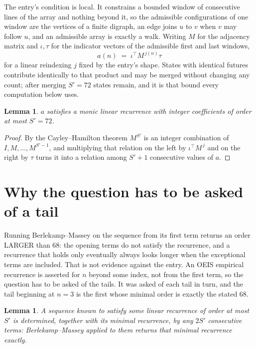 \documentclass[11pt,a4paper]{article}
\theoremstyle{plain}
\newtheorem{lemma}[theorem]{Lemma}
\theoremstyle{definition}
\begin{document}
The entry's condition is local. It constrains a bounded window of consecutive lines of the
array and nothing beyond it, so the admissible configurations of one window are the vertices of
a finite digraph, an edge joins $u$ to $v$ when $v$ may follow $u$, and an admissible array is
exactly a walk. Writing $M$ for the adjacency matrix and $\iota,\tau$ for the indicator vectors
of the admissible first and last windows,
\[
a(n)\;=\;\iota^{\!\top}M^{\,j(n)}\tau
\]
for a linear reindexing $j$ fixed by the entry's shape. States with identical futures
contribute identically to that product and may be merged without changing any count; after
merging $S'=72$ states remain, and it is that bound every computation below uses.

\begin{lemma}\label{lem:cf}
$a$ satisfies a monic linear recurrence with integer coefficients of order at most $S'=72$.
\end{lemma}

\begin{proof}
By the Cayley--Hamilton theorem $M^{S'}$ is an integer combination of $I,M,\dots,M^{S'-1}$,
and multiplying that relation on the left by $\iota^{\!\top}M^{\,j}$ and on the right by
$\tau$ turns it into a relation among $S'+1$ consecutive values of $a$.
\end{proof}

\section{Why the question has to be asked of a tail}

Running Berlekamp--Massey on the sequence from its first term returns an order LARGER than $68$: the opening terms do not satisfy the recurrence, and a recurrence that holds only eventually always looks longer when the exceptional terms are included. That is not evidence against the entry. An OEIS empirical recurrence is asserted for $n$ beyond some index, not from the first term, so the question has to be asked of the tails. It was asked of each tail in turn, and the tail beginning at $n=3$ is the first whose minimal order is exactly the stated $68$.

\begin{lemma}\label{lem:bm}
A sequence known to satisfy some linear recurrence of order at most $S'$ is determined,
together with its minimal recurrence, by any $2S'$ consecutive terms: Berlekamp--Massey applied
to them returns that minimal recurrence exactly.
\end{lemma}
\end{document}
